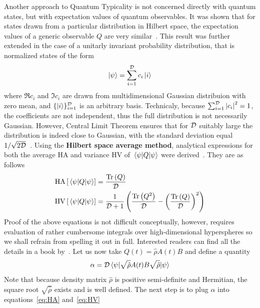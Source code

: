 Another approach to Quantum Typicality is not concerned directly with quantum states, but with
expectation values of quantum observables.
It was shown that for states drawn from a particular distribution in Hilbert space, the expectation
values of a generic observable \(Q\) are very similar~\autocite{Reimann2007}. This result was further extended
in the case of a unitarly invariant probability distribution, that is normalized states of the form
\begin{equation}
	\ket{\psi} = \sum_{i = 1}^{\mathcal{D}} c_i \ket{i}
\end{equation}
where \(\Re c_i\) and \(\Im c_i\) are drawn from multidimensional Gaussian distribuion with zero mean,
and \(\{\ket{i}\}_{i=1}^{\mathcal{D}}\) is an arbitrary basis. Technicaly, because \(\sum_{i=1}^{\mathcal{D}}\abs{c_i}^2 = 1\),
the coefficients are not independent, thus the full distribution is not necessarily Gaussian. However,
Central Limit Theorem ensures that for \(\mathcal{D}\) suitably large the distribution is indeed close to Gaussian,
with the standard deviation equal \(1/\sqrt{2\mathcal{D}}\)~\autocite{Gemmer2009}.
Using the \textbf{Hilbert space average method}, analytical expressions
for both the average \(\mathrm{HA}\) and variance \(\mathrm{HV}\) of \(\matrixel{\psi}{Q}{\psi}\)
were derived~\autocite{Bartsch2009}. They are as follows
\begin{align}
	\mathrm{HA}\left[\matrixel{\psi}{Q}{\psi}\right] & = \frac{\Tr\left(Q\right)}{\dimension} \label{eq:HA} \\
	\mathrm{HV}\left[\matrixel{\psi}{Q}{\psi}\right] & = \frac{1}{\dimension + 1}\left(
	\frac{\Tr\left(Q^2\right)}{\dimension} - \left(\frac{\Tr\left(Q\right)}{\dimension}\right)^2
	\right)\label{eq:HV}
\end{align}
Proof of the above equations is not difficult conceptually, however, requires evaluation of rather
cumbersome integrals over high-dimensional hyperspheres so we shall refrain from spelling it out in full.
Interested readers can find all the details in a book by~\textcite{Gemmer2009}.
Let us now take \(Q(t) = \hat{\rho}A(t)B\)
and define a quantity
\begin{equation}
	\alpha = \dimension \matrixel{\psi}{\sqrt{\hat{\rho}}A(t)B\sqrt{\hat{\rho}}}{\psi}
\end{equation}
Note that because density matrix \(\hat{\rho}\) is positive semi-definite and Hermitian, the
square root \(\sqrt{\hat{\rho}}\) exists and is well defined. The next step is to plug \(\alpha\)
into equations~\eqref{eq:HA} and~\eqref{eq:HV}

